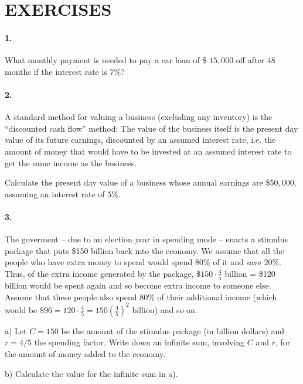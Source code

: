 \section*{EXERCISES}

\begin{multicols}{2}
\paragraph{1.}
What monthly payment is needed to pay a car loan of \$ $15,000$ off after 48
months if the interest rate is $7$\%?

\paragraph{2.}
A standard method for valuing a business (excluding any inventory) is the
``discounted cash flow'' method: The value of the business itself is the
present day value of its future earnings, discounted by an assumed interest
rate, i.e. the amount of money that would have to be invested at an assumed
interest rate to get the same income as the business.

Calculate the present day value of a business whose annual earnings are
{\$}$50,000$, assuming an interest rate of $5$\%.

\paragraph{3.}
The goverment -- due to an election year in spending mode --
enacts a stimulus package that puts \$150 billion back into
the economy.
We assume that all the people who have extra
money to spend would spend 80\% of it and save
20\%. Thus, of the extra income generated by the package,
\$$150\cdot\frac{4}{5}$ billion = \$120 billion would be spent again and
so become extra income to someone else. Assume that
these people also spend 80\% of their additional income
(which would be \$$96=120\cdot\frac{4}{5}=150(\frac{4}{5})^2$ billion) and so on.

\noindent 
a) Let $C=150$ be the amount of the stimulus package (in billion dollars)
and $r=4/5$ the spending factor. Write down an infinite sum, involving $C$
and $r$, for the amount of money added to the economy.

\noindent
b) Calculate the value for the infinite sum in a).
\end{multicols}

